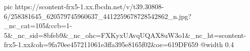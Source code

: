  
 
 
 
 

\ifcmt
  pic https://scontent-frx5-1.xx.fbcdn.net/v/t39.30808-6/258381645_620579745960637_4412259678728542862_n.jpg?_nc_cat=105&ccb=1-5&_nc_sid=8bfeb9&_nc_ohc=FXKyxUAvqUQAX8uW3o1&_nc_ht=scontent-frx5-1.xx&oh=9fa70ee457211061e3ffa395e8165f02&oe=619DF659
  @width 0.4
\fi
